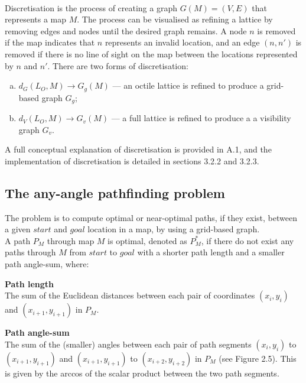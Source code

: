 \documentclass[12pt,notitlepage]{report}
\begin{document}
\\
\noindent
Discretisation is the process of creating a graph $G(M)=(V,E)$ that represents a map $M$. The process can be visualised as refining a lattice by removing edges and nodes until the desired graph remains. A node $n$ is removed if the map indicates that $n$ represents an invalid location, and an edge $(n,n')$ is removed if there is no line of sight on the map between the locations represented by $n$ and $n'$. There are two forms of discretisation:
\begin{enumerate}[(a)]
\item $d_{G}(L_{O},M) \rightarrow G_{g}(M)$ --- an octile lattice is refined to produce a grid-based graph $G_{g}$;
\item  $d_{V}(L_{O},M) \rightarrow G_{v}(M)$ --- a full lattice is refined to produce a a visibility graph $G_{v}$.
\end{enumerate}
 
\noindent
A full conceptual explanation of discretisation is provided in A.1, and the implementation of discretisation is detailed in sections 3.2.2 and 3.2.3.

\subsection{The any-angle pathfinding problem}

The problem is to compute optimal or near-optimal paths, if they exist, between a given $start$ and $goal$ location in a map, by using a grid-based graph.\\

\noindent
A path $P_{M}$ through map $M$ is optimal, denoted as $P^{*}_{M}$, if there do not exist any paths through $M$ from $start$ to $goal$ with a shorter path length and a smaller path angle-sum, where:

\begin{description}
\item{\bfseries Path length}\\
The sum of the Euclidean distances between each pair of coordinates $(x_{i},y_{i})$ and $(x_{i+1},y_{i+1})$ in $P_{M}$.
\item{\bfseries Path angle-sum}\\
The sum of the (smaller) angles between each pair of path segments $(x_{i},y_{i})$ to $(x_{i+1},y_{i+1})$ and $(x_{i+1},y_{i+1})$ to $(x_{i+2},y_{i+2})$ in $P_{M}$ (see Figure 2.5). This is given by the arccos of the scalar product between the two path segments.
\end{description}
\end{document}
